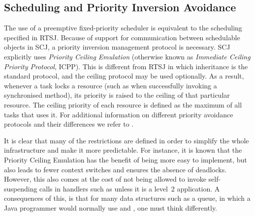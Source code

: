 \subsection{Scheduling and Priority Inversion Avoidance} %
\label{sub:scheduling_and_priority_inversion_avoidance}
The use of a preemptive fixed-priority scheduler is equivalent to the scheduling specified in RTSJ. Because of support for communication between schedulable objects in SCJ, a priority inversion management protocol is necessary. SCJ explicitly uses \textit{Priority Ceiling Emulation} (otherwise known as \textit{Immediate Ceiling Priority Protocol}, ICPP). This is different from RTSJ in which inheritance is the standard protocol, and the ceiling protocol may be used optionally. As a result, whenever a task locks a resource (such as when successfully invoking a synchronised method), its priority is raised to the ceiling of that particular resource. The ceiling priority of each resource is defined as the maximum of all tasks that uses it. For additional information on different priority avoidance protocols and their differences we refer to \cite{alan2001real}.

It is clear that many of the restrictions are defined in order to simplify the whole infrastructure and make it more predictable. For instance, it is known that the Priority Ceiling Emulation has the benefit of being more easy to implement, but also leads to fewer context switches and ensures the absence of deadlocks\cite{alan2001real}. However, this also comes at the cost of not being allowed to invoke self-suspending calls in handlers such as  unless it is a level~2 application. A consequences of this, is that for many data structures such as a queue, in which a Java programmer would normally use  and , one must think differently.


